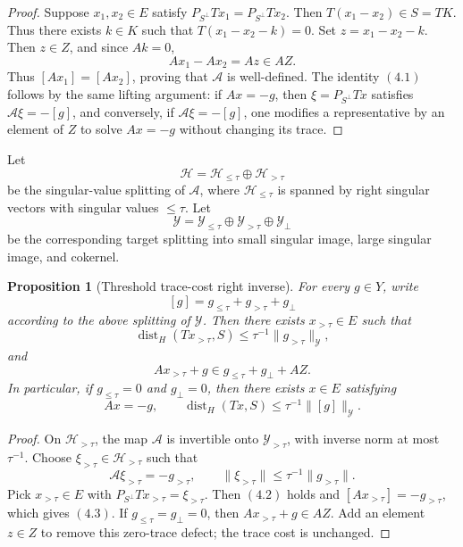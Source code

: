 \documentclass[11pt]{article}
\numberwithin{equation}{section}
\theoremstyle{plain}
\newtheorem{proposition}{Proposition}[section]
\theoremstyle{definition}
\theoremstyle{remark}
\DeclareMathOperator{\dist}{dist}
\begin{document}
\begin{proof}
Suppose \(x_1,x_2\in E\) satisfy \(P_{S^\perp}Tx_1=P_{S^\perp}Tx_2\).  Then \(T(x_1-x_2)\in S=TK\).  Thus there exists \(k\in K\) such that \(T(x_1-x_2-k)=0\).  Set \(z=x_1-x_2-k\).  Then \(z\in Z\), and since \(Ak=0\),
\[
        Ax_1-Ax_2=Az\in AZ.
\]
Thus \([Ax_1]=[Ax_2]\), proving that \(\mathcal A\) is well-defined.  The identity \((4.1)\) follows by the same lifting argument: if \(Ax=-g\), then \(\xi=P_{S^\perp}Tx\) satisfies \(\mathcal A\xi=-[g]\), and conversely, if \(\mathcal A\xi=-[g]\), one modifies a representative by an element of \(Z\) to solve \(Ax=-g\) without changing its trace.
\end{proof}

Let
\[
        \mathcal H=\mathcal H_{\le\tau}\oplus\mathcal H_{>\tau}
\]
be the singular-value splitting of \(\mathcal A\), where \(\mathcal H_{\le\tau}\) is spanned by right singular vectors with singular values \(\le\tau\).  Let
\[
        \mathcal Y=\mathcal Y_{\le\tau}\oplus\mathcal Y_{>\tau}\oplus\mathcal Y_\perp
\]
be the corresponding target splitting into small singular image, large singular image, and cokernel.

\begin{proposition}[Threshold trace-cost right inverse]
\label{pV:prop:threshold-trace-cost}
For every \(g\in Y\), write
\[
        [g]=g_{\le\tau}+g_{>\tau}+g_\perp
\]
according to the above splitting of \(\mathcal Y\).  Then there exists \(x_{>\tau}\in E\) such that
\[
        \dist_H(Tx_{>\tau},S)
        \le
        \tau^{-1}\|g_{>\tau}\|_{\mathcal Y},
        \tag{4.2}
\]
and
\[
        A x_{>\tau}+g\in g_{\le\tau}+g_\perp+AZ.
        \tag{4.3}
\]
In particular, if \(g_{\le\tau}=0\) and \(g_\perp=0\), then there exists \(x\in E\) satisfying
\[
        Ax=-g,
        \qquad
        \dist_H(Tx,S)\le \tau^{-1}\|[g]\|_{\mathcal Y}.
\]
\end{proposition}

\begin{proof}
On \(\mathcal H_{>\tau}\), the map \(\mathcal A\) is invertible onto \(\mathcal Y_{>\tau}\), with inverse norm at most \(\tau^{-1}\).  Choose \(\xi_{>\tau}\in\mathcal H_{>\tau}\) such that
\[
        \mathcal A\xi_{>\tau}=-g_{>\tau},
        \qquad
        \|\xi_{>\tau}\|\le \tau^{-1}\|g_{>\tau}\|.
\]
Pick \(x_{>\tau}\in E\) with \(P_{S^\perp}Tx_{>\tau}=\xi_{>\tau}\).  Then \((4.2)\) holds and \([Ax_{>\tau}]=-g_{>\tau}\), which gives \((4.3)\).  If \(g_{\le\tau}=g_\perp=0\), then \(Ax_{>\tau}+g\in AZ\).  Add an element \(z\in Z\) to remove this zero-trace defect; the trace cost is unchanged.
\end{proof}
\end{document}
